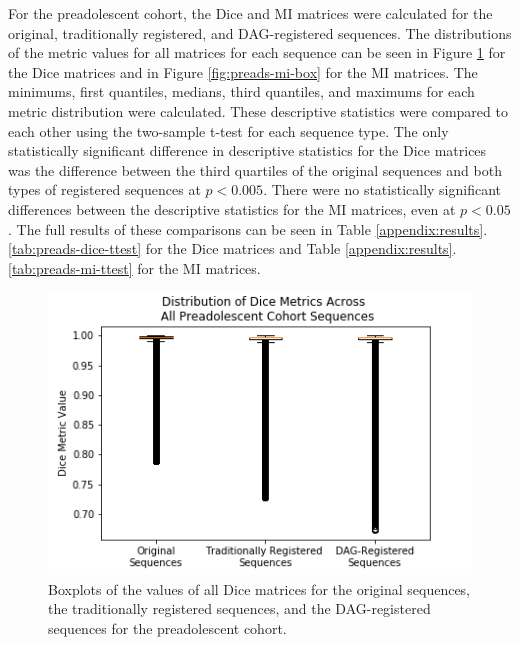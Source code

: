 For the preadolescent cohort, the Dice and MI matrices were calculated for the original, traditionally registered, and DAG-registered sequences. The distributions of the metric values for all matrices for each sequence can be seen in Figure \ref{fig:preads-dice-box} for the Dice matrices and in Figure \ref{fig:preads-mi-box} for the MI matrices. The minimums, first quantiles, medians, third quantiles, and maximums for each metric distribution were calculated. These descriptive statistics were compared to each other using the two-sample t-test for each sequence type. The only statistically significant difference in descriptive statistics for the Dice matrices was the difference between the third quartiles of the original sequences and both types of registered sequences at $p < 0.005$. There were no statistically significant differences between the descriptive statistics for the MI matrices, even at $p < 0.05$. The full results of these comparisons can be seen in Table \ref{appendix:results}.\ref{tab:preads-dice-ttest} for the Dice matrices and Table \ref{appendix:results}.\ref{tab:preads-mi-ttest} for the MI matrices.

\begin{figure}
\centering
\includegraphics[height=0.3\textheight]{6/figures/preads-dice-box.png}
\caption{Boxplots of the values of all Dice matrices for the original sequences, the traditionally registered sequences, and the DAG-registered sequences for the preadolescent cohort.}
\label{fig:preads-dice-box}
\end{figure}


